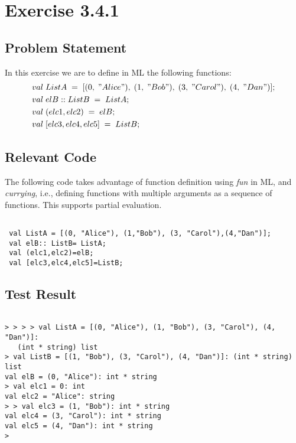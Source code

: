 \documentclass{report}
\begin{document}
\chapter{Exercise 3.4.1}
\label{cha:exercise-3.4.1}

\section{Problem Statement}
\label{sec:problem-statement-6}
In this exercise we are to define in ML the following functions:
\begin{align*}
  &val\; ListA\; =\; [(0,\; "Alice"),\; (1,\;"Bob"),\; (3,\; "Carol"),\;(4,\;"Dan")];\\
                      &val\; elB:: ListB\;= \;ListA;\\
                      &val\; (elc1,elc2)\;=\;elB;\\
                      &val\; [elc3,elc4,elc5]\;=\;ListB;\\
\end{align*}

\section{Relevant Code}
\label{sec:relevant-code-2}


The following code takes advantage of function definition using
\emph{fun} in ML, and \emph{currying}, i.e., defining functions with multiple arguments as a sequence of functions. This supports partial evaluation.

\lstset{frameround=fftt}
\begin{lstlisting}[frame=tRBL]

 val ListA = [(0, "Alice"), (1,"Bob"), (3, "Carol"),(4,"Dan")];
 val elB:: ListB= ListA;
 val (elc1,elc2)=elB;
 val [elc3,elc4,elc5]=ListB;
\end{lstlisting}


\section{Test Result}
\label{sec:test-result}
\setcounter{sessioncount}{0}
\begin{session}
  \begin{scriptsize}
\begin{verbatim}

> > > > val ListA = [(0, "Alice"), (1, "Bob"), (3, "Carol"), (4, "Dan")]:
   (int * string) list
> val ListB = [(1, "Bob"), (3, "Carol"), (4, "Dan")]: (int * string) list
val elB = (0, "Alice"): int * string
> val elc1 = 0: int
val elc2 = "Alice": string
> > val elc3 = (1, "Bob"): int * string
val elc4 = (3, "Carol"): int * string
val elc5 = (4, "Dan"): int * string
> 
\end{verbatim}
  \end{scriptsize}
\end{session}
\end{document}
